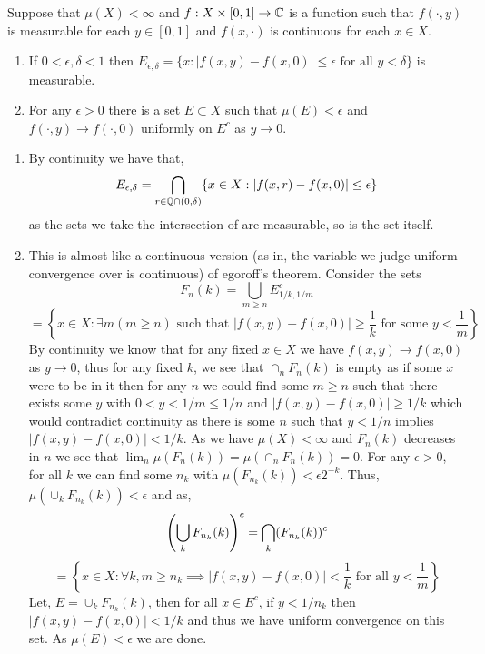 \documentclass[12pt,a4paper]{article}
\begin{document}
\begin{problem}\label{prob:2-43}
Suppose that $\mu(X) < \infty$ and $f: X \times [0, 1] \to \mathbb{C}$ is a function such that $f(\cdot, y)$ is measurable for each $y \in [0, 1]$ and $f(x, \cdot)$ is continuous for each $x \in X$.
\begin{enumerate}[label=\alph*.]
    \item If $0 < \epsilon, \delta < 1$ then $E_{\epsilon, \delta} = \{x : |f(x, y) - f(x, 0)| \le \epsilon \text{ for all } y < \delta\}$ is measurable.
    \item For any $\epsilon > 0$ there is a set $E \subset X$ such that $\mu(E) < \epsilon$ and $f(\cdot, y) \to f(\cdot, 0)$ uniformly on $E^c$ as $y \to 0$.
\end{enumerate}
\end{problem}
\begin{solution}
\begin{enumerate}[label=\alph*.]
	\item By continuity we have that,
		\[
			E_{\epsilon,\delta}=\bigcap_{r\in\mathbb{Q}\cap(0,\delta)}\{x\in X:|f(x,r)-f(x,0)|\leq\epsilon\}
		\]
	as the sets we take the intersection of are measurable, so is the set itself.
	\item This is almost like a continuous version (as in, the variable we judge uniform convergence over is continuous) of egoroff's theorem. Consider the sets
		\[
			F_n(k) = \bigcup_{m\geq n}E_{1/k,1/m}^c
		\]
		\[
			= \left\{x\in X:\exists m(m\geq n)\text{ such that }|f(x,y)-f(x,0)|\geq\frac{1}{k}\text{ for some }y< \frac{1}{m}\right\}
		\]
		By continuity we know that for any fixed $x\in X$ we have $f(x,y)\to f(x,0)$ as $y\to 0$, thus for any fixed $k$, we see that $\cap_n F_n(k)$ is empty as if some $x$ were to be in it then for any $n$ we could find some $m\geq n$ such that there exists some $y$ with $0<y<1/m\leq 1/n$ and $|f(x,y)-f(x,0)|\geq 1/k$ which would contradict continuity as there is some $n$ such that $y<1/n$ implies $|f(x,y)-f(x,0)|<1/k$. 
		As we have $\mu(X)<\infty$ and $F_n(k)$ decreases in $n$ we see that $\lim_n\mu(F_n(k))=\mu(\cap_nF_n(k))=0$.
		For any $\epsilon>0$, for all $k$ we can find some $n_k$ with $\mu(F_{n_k}(k))<\epsilon 2^{-k}$.
	Thus, $\mu(\cup_k F_{n_k}(k))<\epsilon$ and as,
	\[
		\qty(\bigcup_kF_{n_k}(k))^c=\bigcap_k(F_{n_k}(k))^c
	\]
	\[
		=\left\{x\in X:\forall k,m\geq n_k\implies|f(x,y)-f(x,0)|< \frac{1}{k}\text{ for all }y< \frac{1}{m}\right\}
	\]
	Let, $E=\cup_kF_{n_k}(k)$, then for all $x\in E^c$, if $y<1/n_k$ then $|f(x,y)-f(x,0)|<1/k$ and thus we have uniform convergence on this set.
	As $\mu(E)<\epsilon$ we are done.
\end{enumerate}   
\end{solution}
\end{document}

